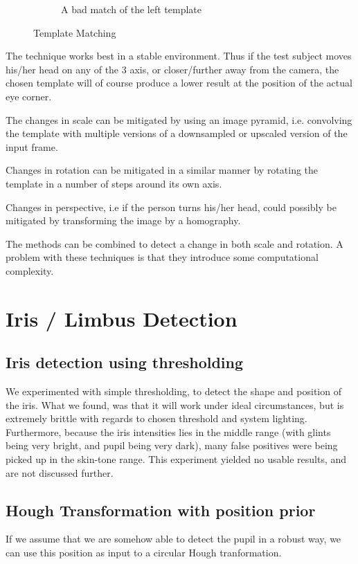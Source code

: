 \documentclass[a4paper,11pt]{article}
\begin{document}
\begin{figure}[H]
\begin{subfigure}{.32\textwidth}
  \caption{A bad match of the left template}
  \label{fig:templatemathing23}
\end{subfigure}
\caption{Template Matching }
\label{fig:templatemathing}
\end{figure}

The technique works best in a stable environment. Thus if the test subject moves his/her head on any of the 3 axis, or closer/further away from the camera, the chosen template will of course produce a lower result at the position of the actual eye corner.

The changes in scale can be mitigated by using an image pyramid, i.e. convolving the template with multiple versions of a downsampled or upscaled version of the input frame.

Changes in rotation can be mitigated in a similar manner by rotating the template in a number of steps around its own axis.

Changes in perspective, i.e if the person turns his/her head, could possibly be mitigated by transforming the image by a homography.

The methods can be combined to detect a change in both scale and rotation. A problem with these techniques is that they introduce some computational complexity.



\section{Iris / Limbus Detection}
\subsection{Iris detection using thresholding}
We experimented with simple thresholding, to detect the shape and position of the iris. What we found, was that it will work under ideal circumstances, but is extremely brittle with regards to chosen threshold and system lighting. Furthermore, because the iris intensities lies in the middle range (with glints being very bright, and pupil being very dark), many false positives were being picked up in the skin-tone range. This experiment yielded no usable results, and are not discussed further.
\subsection{Hough Transformation with position prior}
If we assume that we are somehow able to detect the pupil in a robust way, we can use this position as input to a circular Hough tranformation.
\end{document}
